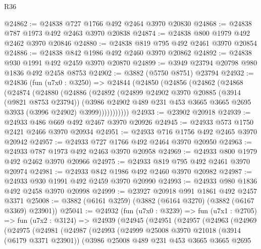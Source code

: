 \begin{lexlean}{R36}
\begin{coremodule}
@24862 := @24838 @727 @1766 @492 @2464 @3970 @20830
@24868 := @24838 @787 @1973 @492 @2463 @3970 @20838
@24874 := @24838 @800 @1979 @492 @2462 @3970 @20846
@24880 := @24838 @819 @795 @492 @2461 @3970 @20854
@24886 := @24838 @842 @1986 @492 @2460 @3970 @20862
@24892 := @24838 @930 @1991 @492 @2459 @3970 @20870
@24899 := @3949 @23794 @20798 @980 @1836 @492 @2458 @8753
@24902 := @3882 (@5750 @8751) @23794
@24932 := @24836
    (fun (u7x0 : @3250) =>
    @24844
      (@24850
        (@24856
          (@24862
            (@24868
              (@24874
                (@24880
                  (@24886
                    (@24892
                      (@24899
                        @24902
                        @3970
                        @20885
                        (@3914 (@9821 @8753 @23794))
                        (@3986
                          @24902
                          @489
                          @231
                          @453
                          @3665
                          @3665
                          @2695
                          @3933
                          (@3996 @24902)
                          @3999)))))))))))
@24933 := @23902 @20918
@24939 := @24933 @486 @669 @492 @2467 @3970 @20926
@24945 := @24933 @573 @1750 @2421 @2466 @3970 @20934
@24951 := @24933 @716 @1756 @492 @2465 @3970 @20942
@24957 := @24933 @727 @1766 @492 @2464 @3970 @20950
@24963 := @24933 @787 @1973 @492 @2463 @3970 @20958
@24969 := @24933 @800 @1979 @492 @2462 @3970 @20966
@24975 := @24933 @819 @795 @492 @2461 @3970 @20974
@24981 := @24933 @842 @1986 @492 @2460 @3970 @20982
@24987 := @24933 @930 @1991 @492 @2459 @3970 @20990
@24993 := @24933 @980 @1836 @492 @2458 @3970 @20998
@24999 := @23927 @20918 @991 @1861 @492 @2457 @3371
@25008 := @3882 (@6161 @3259) (@3882 (@6164 @3270) (@3882 (@6167 @3369) @23901))
@25041 := @24932
    (fun (u7x0 : @3239) =>
    fun (u7x1 : @2705) =>
    fun (u7x2 : @3124) =>
    @24939
      (@24945
        (@24951
          (@24957
            (@24963
              (@24969
                (@24975
                  (@24981
                    (@24987
                      (@24993
                        (@24999
                          @25008
                          @3970
                          @21018
                          (@3914 (@6179 @3371 @23901))
                          (@3986
                            @25008
                            @489
                            @231
                            @453
                            @3665
                            @3665
                            @2695

\end{coremodule}
\end{lexlean}
